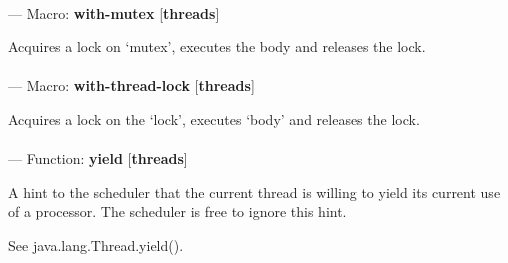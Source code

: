 \paragraph{}
\label{THREADS:WITH-MUTEX}
--- Macro: \textbf{with-mutex} [\textbf{threads}] \textit{}

\begin{adjustwidth}{5em}{5em}
Acquires a lock on `mutex', executes the body
and releases the lock.
\end{adjustwidth}

\paragraph{}
\label{THREADS:WITH-THREAD-LOCK}
--- Macro: \textbf{with-thread-lock} [\textbf{threads}] \textit{}

\begin{adjustwidth}{5em}{5em}
Acquires a lock on the `lock', executes `body' and releases the lock.
\end{adjustwidth}

\paragraph{}
\label{THREADS:YIELD}
--- Function: \textbf{yield} [\textbf{threads}] \textit{}

\begin{adjustwidth}{5em}{5em}
A hint to the scheduler that the current thread is willing to yield its current use of a processor. The scheduler is free to ignore this hint. 

See java.lang.Thread.yield().
\end{adjustwidth}

